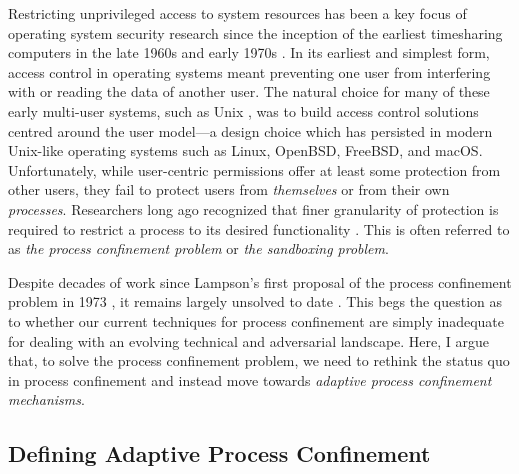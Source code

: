 \documentclass[dvipsnames, 12pt]{article}
\begin{document}
Restricting unprivileged access to system resources has been a key focus of
operating system security research since the inception of the earliest
timesharing computers in the late 1960s and early 1970s
\cite{graham1968_protection, ritchie1973_unix, corbato1962_ctss}. In its
earliest and simplest form, access control in operating systems meant preventing
one user from interfering with or reading the data of another user. The natural
choice for many of these early multi-user systems, such as Unix
\cite{ritchie1973_unix}, was to build access control solutions centred around
the user model---a design choice which has persisted in modern Unix-like
operating systems such as Linux, OpenBSD, FreeBSD, and macOS.  Unfortunately,
while user-centric permissions offer at least some protection from other users,
they fail to protect users from \textit{themselves} or from their own
\textit{processes}.  Researchers long ago recognized that finer granularity of
protection is required to restrict a process to its desired functionality
\cite{lampson1973_a_note}. This is often referred to as \textit{the process
confinement problem} or \textit{the sandboxing problem}.

Despite decades of work since Lampson's first proposal of the process
confinement problem in 1973 \cite{lampson1973_a_note}, it remains largely
unsolved to date \cite{crowell2013_confinement_problem}. This begs the question
as to whether our current techniques for process confinement are simply
inadequate for dealing with an evolving technical and adversarial landscape.
Here, I argue that, to solve the process confinement problem, we need
to rethink the status quo in process confinement and instead move towards
\textit{adaptive process confinement mechanisms}.

\subsection{Defining Adaptive Process Confinement}
\label{sec:defining}
\end{document}
